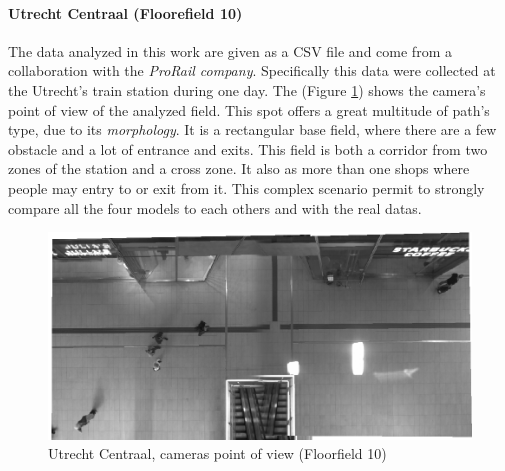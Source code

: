 \documentclass[class=article, crop=false]{standalone}
\begin{document}



\paragraph{Utrecht Centraal (Floorefield 10)}
The data analyzed in this work are given as a CSV file and come from a collaboration with the \emph{ProRail company}.
Specifically this data were collected at the Utrecht’s train station during one day.
The (Figure \ref{fig:trainf10}) shows the camera’s point of view of the analyzed field.
This spot offers a great multitude of path's type, due to its \emph{morphology}. 
It is a rectangular base field, where there are a few obstacle and a lot of entrance and exits.
This field is both a corridor from two zones of the station and a cross zone. 
It also as more than one shops where people may entry to or exit from it.
This complex scenario permit to strongly compare all the four models to each others and with the real datas.

\begin{figure}[h]
\centering
\includegraphics[width=0.4\textheight]{imgs/bg10.png}
\caption{Utrecht Centraal, cameras point of view (Floorfield 10)}
\label{fig:trainf10}
\end{figure}
\end{document}
